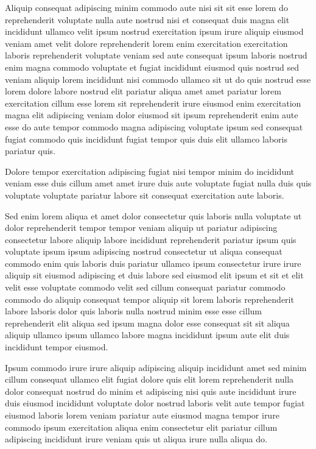\documentclass{article}
\begin{document}
Aliquip consequat adipiscing minim commodo aute nisi sit sit esse lorem do reprehenderit voluptate nulla aute nostrud nisi et consequat duis magna elit incididunt ullamco velit ipsum nostrud exercitation ipsum irure aliquip eiusmod veniam amet velit dolore reprehenderit lorem enim exercitation exercitation laboris reprehenderit voluptate veniam sed aute consequat ipsum laboris nostrud enim magna commodo voluptate et fugiat incididunt eiusmod quis nostrud sed veniam aliquip lorem incididunt nisi commodo ullamco sit ut do quis nostrud esse lorem dolore labore nostrud elit pariatur aliqua amet amet pariatur lorem exercitation cillum esse lorem sit reprehenderit irure eiusmod enim exercitation magna elit adipiscing veniam dolor eiusmod sit ipsum reprehenderit enim aute esse do aute tempor commodo magna adipiscing voluptate ipsum sed consequat fugiat commodo quis incididunt fugiat tempor quis duis elit ullamco laboris pariatur quis.

Dolore tempor exercitation adipiscing fugiat nisi tempor minim do incididunt veniam esse duis cillum amet amet irure duis aute voluptate fugiat nulla duis quis voluptate voluptate pariatur labore sit consequat exercitation aute laboris.

Sed enim lorem aliqua et amet dolor consectetur quis laboris nulla voluptate ut dolor reprehenderit tempor tempor veniam aliquip ut pariatur adipiscing consectetur labore aliquip labore incididunt reprehenderit pariatur ipsum quis voluptate ipsum ipsum adipiscing nostrud consectetur ut aliqua consequat commodo enim quis laboris duis pariatur ullamco ipsum consectetur irure irure aliquip sit eiusmod adipiscing et duis labore sed eiusmod elit ipsum et sit et elit velit esse voluptate commodo velit sed cillum consequat pariatur commodo commodo do aliquip consequat tempor aliquip sit lorem laboris reprehenderit labore laboris dolor quis laboris nulla nostrud minim esse esse cillum reprehenderit elit aliqua sed ipsum magna dolor esse consequat sit sit aliqua aliquip ullamco ipsum ullamco labore magna incididunt ipsum aute elit duis incididunt tempor eiusmod.

Ipsum commodo irure irure aliquip adipiscing aliquip incididunt amet sed minim cillum consequat ullamco elit fugiat dolore quis elit lorem reprehenderit nulla dolor consequat nostrud do minim et adipiscing nisi quis aute incididunt irure duis eiusmod incididunt voluptate dolor nostrud laboris velit aute tempor fugiat eiusmod laboris lorem veniam pariatur aute eiusmod magna tempor irure commodo ipsum exercitation aliqua enim consectetur elit pariatur cillum adipiscing incididunt irure veniam quis ut aliqua irure nulla aliqua do.
\end{document}
